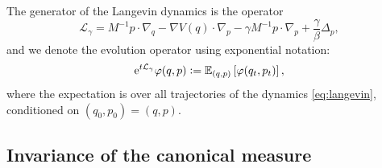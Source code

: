 The generator of the Langevin dynamics is the operator
\begin{equation}
  \label{eq:langevin_generator}
\mathcal L_\gamma=M^{-1}p\cdot \nabla_q-\nabla V(q) \cdot \nabla_p- \gamma M^{-1} p \cdot \nabla_p+\frac\gamma\beta \Delta_p,
\end{equation}
and we denote the evolution operator using exponential notation:
\begin{equation}
    \label{eq:langevin_evolution_operator}
    \mathrm{e}^{t\mathcal{L}_\gamma}\varphi(q,p) \mathrel{\mathop:}= \mathbb{E}_{(q,p)}\left[\varphi(q_t,p_t)\right],
\end{equation}
where the expectation is over all trajectories of the dynamics \eqref{eq:langevin}, conditioned on $(q_0,p_0)=(q,p)$.

    \subsection{Invariance of the canonical measure}

